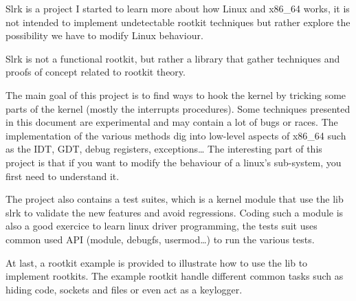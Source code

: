 Slrk is a project I started to learn more about how Linux and x86_64 works,
it is not intended to implement undetectable rootkit techniques but rather
explore the possibility we have to modify Linux behaviour.

Slrk is not a functional rootkit, but rather a library that gather techniques
and proofs of concept related to rootkit theory.

The main goal of this project is to find ways to hook the kernel by tricking
some parts of the kernel (mostly the interrupts procedures).
Some techniques presented in this document are experimental and may contain
a lot of bugs or races.
The implementation of the various methods dig into low-level aspects of
x86_64 such as the IDT, GDT, debug registers, exceptions…
The interesting part of this project is that if you want to modify the
behaviour of a linux's sub-system, you first need to understand it.

The project also contains a test suites, which is a kernel module that use
the lib slrk to validate the new features and avoid regressions.
Coding such a module is also a good exercice to learn linux driver programming,
the tests suit uses common used API (module, debugfs, usermod…) to run the
various tests.

At last, a rootkit example is provided to illustrate how to use the lib to
implement rootkits. The example rootkit handle different common tasks such
as hiding code, sockets and files or even act as a keylogger.
